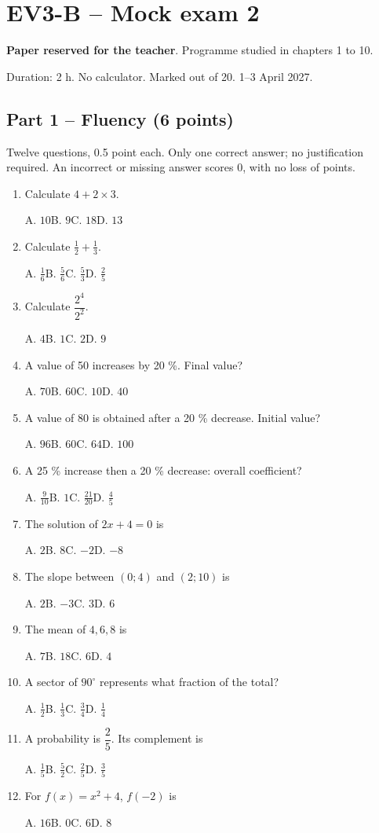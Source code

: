 \clearpage\section*{EV3-B -- Mock exam 2}\label{EV3-B}
\textbf{Paper reserved for the teacher}. Programme studied in chapters 1 to 10.\par Duration: 2 h. No calculator. Marked out of 20. 1--3 April 2027.
\subsection*{Part 1 -- Fluency (6 points)}
Twelve questions, 0.5 point each. Only one correct answer; no justification required. An incorrect or missing answer scores 0, with no loss of points.
\begin{enumerate}
\item Calculate $4+2\times3$.\par A. $10$\quad B. $9$\quad C. $18$\quad D. $13$
\item Calculate $\frac12+\frac13$.\par A. $\frac{1}{6}$\quad B. $\frac{5}{6}$\quad C. $\frac{5}{3}$\quad D. $\frac{2}{5}$
\item Calculate $\dfrac{2^4}{2^{2}}$.\par A. $4$\quad B. $1$\quad C. $2$\quad D. $9$
\item A value of 50 increases by 20 \%. Final value?\par A. $70$\quad B. $60$\quad C. $10$\quad D. $40$
\item A value of 80 is obtained after a 20 \% decrease. Initial value?\par A. $96$\quad B. $60$\quad C. $64$\quad D. $100$
\item A 25 \% increase then a 20 \% decrease: overall coefficient?\par A. $\frac{9}{10}$\quad B. $1$\quad C. $\frac{21}{20}$\quad D. $\frac{4}{5}$
\item The solution of $2x+4=0$ is\par A. $2$\quad B. $8$\quad C. $-2$\quad D. $-8$
\item The slope between $(0;4)$ and $(2;10)$ is\par A. $2$\quad B. $-3$\quad C. $3$\quad D. $6$
\item The mean of $4, 6, 8$ is\par A. $7$\quad B. $18$\quad C. $6$\quad D. $4$
\item A sector of $90^\circ$ represents what fraction of the total?\par A. $\frac{1}{2}$\quad B. $\frac{1}{3}$\quad C. $\frac{3}{4}$\quad D. $\frac{1}{4}$
\item A probability is $\dfrac{2}{5}$. Its complement is\par A. $\frac{1}{5}$\quad B. $\frac{5}{2}$\quad C. $\frac{2}{5}$\quad D. $\frac{3}{5}$
\item For $f(x)=x^2+4$, $f(-2)$ is\par A. $16$\quad B. $0$\quad C. $6$\quad D. $8$
\end{enumerate}
